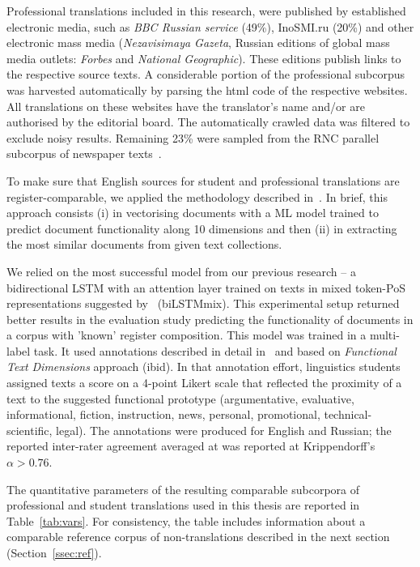 Professional translations included in this research, were published by established electronic media, such as \textit{BBC Russian service}  (49\%), InoSMI.ru (20\%) and other electronic mass media (\textit{Nezavisimaya Gazeta}, Russian editions of global mass media outlets: \textit{Forbes} and \textit{National Geographic}). These editions publish links to the respective source texts. A considerable portion of the professional subcorpus was harvested automatically by parsing the html code of the respective websites. All translations on these websites have the translator's name and/or are authorised by the editorial board.
The automatically crawled data was filtered to exclude noisy results.
Remaining 23\% were sampled from the \gls{RNC} parallel subcorpus of newspaper texts~\cite{Sitchinava2019}. 

\label{pg:stu_pro_made_comparable}
To make sure that  English sources for student and professional translations are register-comparable, we applied the methodology described in~\citet{Kunilovskaya2019similar}. In brief, this approach consists (i) in vectorising documents with a ML model trained to predict document functionality along 10 dimensions and then (ii) in extracting the most similar documents from given text collections.

We relied on the most successful model from our previous research -- a bidirectional LSTM with an attention layer trained on texts in mixed token-PoS representations suggested by~\citet{Baroni2006} (biLSTMmix). This experimental setup returned better results in the evaluation study predicting the functionality of documents in a corpus with 'known' register composition. 
This model was trained in a multi-label task. It used annotations described in detail in~\citet{Sharoff2018} and based on \textit{Functional Text Dimensions} approach (ibid). In that annotation effort, linguistics students assigned texts a score on a 4-point Likert scale that reflected the proximity of a text to the suggested functional prototype (argumentative, evaluative, informational, fiction, instruction, news, personal, promotional, technical-scientific, legal). The annotations were produced for English and Russian; the reported inter-rater agreement averaged at was reported at Krippendorff's $\alpha > 0.76$. 

The quantitative parameters of the resulting comparable subcorpora of professional and student translations used in this thesis are reported in Table~\ref{tab:vars}. For consistency, the table includes information about a comparable reference corpus of non-translations described in the next section (Section~\ref{ssec:ref}).

